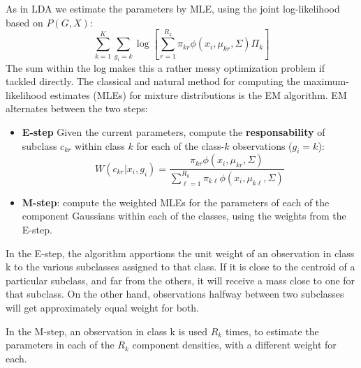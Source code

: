 As in LDA we estimate the parameters by MLE, using the joint log-likelihood based on $P(G,X)$:
\begin{equation}
\sum_{k=1}^K\sum_{g_i=k} \log \left[ \sum_{r=1}^{R_k} \pi_{k r} \phi (x_i,\mu_{k r}, \Sigma)\Pi_k\right]
\end{equation}
The sum within the log makes this a rather messy optimization problem if tackled directly. The classical and natural method for computing the maximum-likelihood estimates (MLEs) for mixture distributions is the EM algorithm. EM alternates between the two steps:
\begin{itemize}
\item \textbf{E-step} Given the current parameters, compute the \textbf{responsability} of subclass $c_{kr}$ within class $k$ for each of the class-$k$ observations ($g_i=k$):
\begin{equation}
W(c_{kr}|x_i, g_i) = \frac{ \pi_{kr}\phi(x_i, \mu_{kr},\Sigma)}{\sum_{\ell=1}^{R_k} \pi_{k \ell}\phi(x_i, \mu_{k \ell},\Sigma)}
\end{equation}
\item \textbf{M-step}: compute the weighted MLEs for the parameters of each of the component Gaussians within each of the classes, using the weights from the E-step.
\end{itemize}

In the E-step, the algorithm apportions the unit weight of an observation in class k to the various subclasses assigned to that class. If it is close to the centroid of a particular subclass, and far from the others, it will receive a mass close to one for that subclass. On the other hand, observations halfway between two subclasses will get approximately equal weight for both.

In the M-step, an observation in class k is used $R_k$ times, to estimate the parameters in each of the $R_k$ component densities, with a different weight for each.